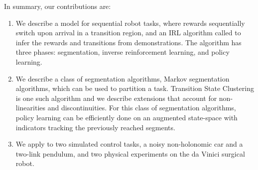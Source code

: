In summary, our contributions are:
\begin{enumerate}
\item We describe a model for sequential robot tasks, where rewards sequentially switch upon arrival in a transition region, and an IRL algorithm called \hirlfull to infer the rewards and transitions from demonstrations. The algorithm has three phases: segmentation, inverse reinforcement learning, and policy learning.
\item We describe a class of segmentation algorithms, Markov segmentation algorithms, which can be used to partition a task. Transition State Clustering is one such algorithm and we describe extensions that account for non-linearities and discontinuities. For this class of segmentation algorithms, policy learning can be efficiently done on an augmented state-space with indicators tracking the previously reached segments.
\item We apply \hirl to two simulated control tasks, a noisy non-holonomic car and a two-link pendulum, and two physical experiments on the da Vinici surgical robot.
\end{enumerate}



